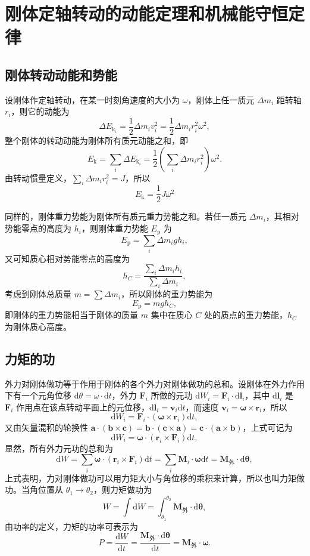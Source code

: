 \section{刚体定轴转动的动能定理和机械能守恒定律}
    \subsection{刚体转动动能和势能}
    设刚体作定轴转动，在某一时刻角速度的大小为 $\omega$，刚体上任一质元 $\Delta m_i$ 距转轴 $r_i$，则它的动能为
    \[
    \Delta E_{\mathrm{k}_i}=\frac12 \Delta m_i v_i^2=\frac12 \Delta m_i r_i^2 \omega^2,
    \]
    整个刚体的转动动能为刚体所有质元动能之和，即
    \[
    E_\mathrm{k}=\sum_i \Delta E_{\mathrm{k}_i}=\frac12 \left(\sum_i \Delta m_i r_i^2\right)\omega^2.
    \]
    由转动惯量定义，$\sum_i \Delta m_i r_i^2 = J$，所以
    \[
    E_\mathrm{k}=\dfrac{1}{2}J\omega^2
    \]

    同样的，刚体重力势能为刚体所有质元重力势能之和。若任一质元 $\Delta m_i$，其相对势能零点的高度为 $h_i$，则刚体重力势能 $E_\mathrm{p}$ 为
    \[
    E_\mathrm{p}=\sum_i \Delta m_i g h_i,
    \]
    又可知质心相对势能零点的高度为
    \[
    h_C=\frac{\sum_i \Delta m_i h_i}{\sum_i \Delta m_i},
    \]
    考虑到刚体总质量 $m=\sum \Delta m_i$，所以刚体的重力势能为
    \[
    E_\mathrm{p}=m g h_C,
    \]
    即刚体的重力势能相当于刚体的质量 $m$ 集中在质心 $C$ 处的质点的重力势能，$h_C$ 为刚体质心高度。

    \subsection{力矩的功}
    外力对刚体做功等于作用于刚体的各个外力对刚体做功的总和。设刚体在外力作用下有一个元角位移 $\mathrm{d}\theta=\omega \cdot \mathrm{d}t$，外力 $\boldsymbol{F}_i$ 所做的元功 $\mathrm{d}W_i=\boldsymbol{F}_i \cdot \mathrm{d}\boldsymbol{l}_i$，其中 $\mathrm{d}\boldsymbol{l}_i$ 是 $\boldsymbol{F}_i$ 作用点在该点转动平面上的元位移，$\mathrm{d}\boldsymbol{l}_i=\boldsymbol{v}_i \mathrm{d}t$，而速度 $\boldsymbol{v}_i=\boldsymbol{\omega}\times\boldsymbol{r}_i$，所以
    \[
    \mathrm{d}W_i=\boldsymbol{F}_i \cdot (\boldsymbol{\omega}\times\boldsymbol{r}_i)\mathrm{d}t,
    \]
    又由矢量混积的轮换性 $\boldsymbol{a}\cdot(\boldsymbol{b}\times\boldsymbol{c})=\boldsymbol{b}\cdot(\boldsymbol{c}\times\boldsymbol{a})=\boldsymbol{c}\cdot(\boldsymbol{a}\times\boldsymbol{b})$，上式可记为
    \[
    \mathrm{d}W_i=\boldsymbol{\omega}\cdot(\boldsymbol{r}_i\times\boldsymbol{F}_i)\mathrm{d}t,
    \]
    显然，所有外力元功的总和为
    \[
    \mathrm{d}W=\sum_i \boldsymbol{\omega}\cdot(\boldsymbol{r}_i\times\boldsymbol{F}_i)\mathrm{d}t=\sum_i \boldsymbol{M}_i \cdot \boldsymbol{\omega}\mathrm{d}t=\boldsymbol{M}_\text{外}\cdot \mathrm{d}\boldsymbol{\theta},
    \]
    上式表明，力对刚体做功可以用力矩大小与角位移的乘积来计算，所以也叫力矩做功。当角位置从 $\theta_1\rightarrow\theta_2$，则力矩做功为
    \[
    W=\int \mathrm{d}W=\int_{\theta_1}^{\theta_2} \boldsymbol{M}_\text{外} \cdot \mathrm{d}\boldsymbol{\theta},
    \]
    由功率的定义，力矩的功率可表示为
    \[
    P=\frac{\mathrm{d}W}{\mathrm{d}t}=\frac{\boldsymbol{M}_\text{外}\cdot \mathrm{d}\boldsymbol{\theta}}{\mathrm{d}t}=\boldsymbol{M}_\text{外}\cdot \boldsymbol{\omega}.
    \]


